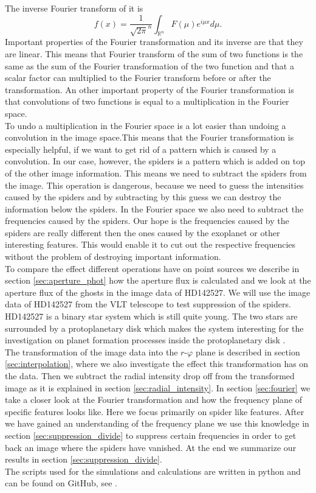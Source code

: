 The inverse Fourier transform of it is
\begin{equation}
	f(x) = \frac{1}{\sqrt{2\pi}^n} \int_{\mathbb{R}^n} F(\mu) e^{i\mu x} d\mu.
\end{equation}
Important properties of the Fourier transformation and its inverse are that they are linear. This means that Fourier transform of the sum of two functions is the same as the sum of the Fourier transformation of the two function and that a scalar factor can multiplied to the Fourier transform before or after the transformation. An other important property of the Fourier transformation is that convolutions of two functions is equal to a multiplication in the Fourier space. \\
To undo a multiplication in the Fourier space is a lot easier than undoing a convolution in the image space.This means that the Fourier transformation is especially helpful, if we want to get rid of a pattern which is caused by a convolution. In our case, however, the spiders is a pattern which is added on top of the other image information. This means we need to subtract the spiders from the image. This operation is dangerous, because we need to guess the intensities caused by the spiders and by subtracting by this guess we can destroy the information below the spiders. In the Fourier space we also need to subtract the frequencies caused by the spiders. Our hope is the frequencies caused by the spiders are really different then the ones caused by the exoplanet or other interesting features. This would enable it to cut out the respective frequencies without the problem of destroying important information.\\
To compare the effect different operations have on point sources we describe in section \ref{sec:aperture_phot} how the aperture flux is calculated and we look at the aperture flux of the ghosts in the image data of HD142527. We will use the image data of HD142527 from the VLT telescope to test suppression of the spiders. HD142527 is a binary star system which is still quite young. The two stars are surrounded by a protoplanetary disk which makes the system interesting for the investigation on planet formation processes inside the protoplanetary disk \cite{HD142527}.\\
The transformation of the image data into the $r$-$\varphi$ plane is described in section \ref{sec:interpolation}, where we also investigate the effect this transformation has on the data. Then we subtract the radial intensity drop off from the transformed image as it is explained in section \ref{sec:radial_intensity}. In section \ref{sec:fourier} we take a closer look at the Fourier transformation and how the frequency plane of specific features looks like. Here we focus primarily on spider like features. After we have gained an understanding of the frequency plane we use this knowledge in section \ref{sec:suppression_divide} to suppress certain frequencies in order to get back an image where the spiders have vanished. At the end we summarize our results in section \ref{sec:suppression_divide}.\\
The scripts used for the simulations and calculations are written in python and can be found 
on GitHub, see \cite{github}.
